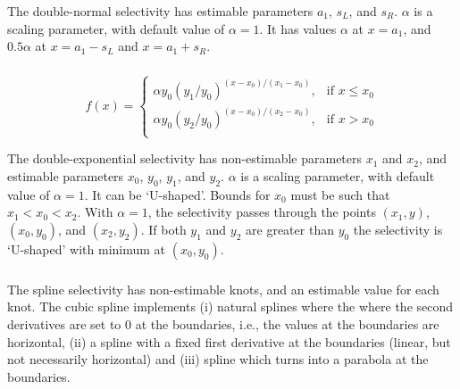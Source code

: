 The double-normal selectivity has estimable parameters $a_1$, $s_L$, and $s_R$. $\alpha$ is a scaling parameter, with default value of $\alpha = 1$. It has values $\alpha$ at $x=a_1$, and $0.5 \alpha$ at $x=a_1-s_L$ and $x=a_1+s_R$. 

\subsubsection[Double-exponential]{}

\begin{equation} 
f(x)=\begin{cases}
	  \alpha y_0(y_1 / y_0)^{(x-x_0)/(x_1-x_0)}, & \text{if $x \le x_0$} \\
	  \alpha y_0(y_2 / y_0)^{(x-x_0)/(x_2-x_0)}, & \text{if $x > x_0$} \\
  \end{cases}
\end{equation}

The double-exponential selectivity has non-estimable parameters $x_1$ and $x_2$, and estimable parameters $x_0$, $y_0$, $y_1$, and $y_2$.  $\alpha$ is a scaling parameter, with default value of $\alpha = 1$. It can be `U-shaped'. Bounds for $x_0$ must be such that $x_1 < x_0 < x_2$. With $\alpha=1$, the selectivity passes through the points $(x_1, y)$, $(x_0, y_0)$, and $(x_2, y_2)$. If both $y_1$ and $y_2$ are greater than $y_0$ the selectivity is `U-shaped' with minimum at $(x_0, y_0)$.

\subsubsection[Spline]{}

The spline selectivity has non-estimable knots, and an estimable value for each knot. The cubic spline implements
(i) natural splines where the where the second derivatives are set to 0 at the boundaries, i.e., the values at the boundaries are horizontal, (ii) a spline with a fixed first derivative at the boundaries (linear, but not necessarily horizontal) and (iii) spline which turns into a parabola at the boundaries.





